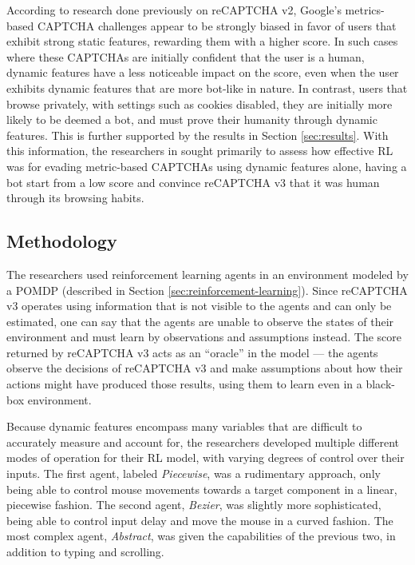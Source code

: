 \documentclass[sigplan,screen,nonacm]{acmart-tagged}
\begin{document}
According to research done previously on reCAPTCHA v2, Google's metrics-based CAPTCHA challenges appear to be strongly biased in favor of users that exhibit strong static features, rewarding them with a higher score. In such cases where these CAPTCHAs are initially confident that the user is a human, dynamic features have a less noticeable impact on the score, even when the user exhibits dynamic features that are more bot-like in nature. In contrast, users that browse privately, with settings such as cookies disabled, they are initially more likely to be deemed a bot, and must prove their humanity through dynamic features. This is further supported by the results in Section \ref{sec:results}. With this information, the researchers in \cite{tsingen} sought primarily to assess how effective RL was for evading metric-based CAPTCHAs using dynamic features alone, having a bot start from a low score and convince reCAPTCHA v3 that it was human through its browsing habits.

\subsection{Methodology}
\label{sec:methodology}

The researchers used reinforcement learning agents in an environment modeled by a POMDP (described in Section \ref{sec:reinforcement-learning}). Since reCAPTCHA v3 operates using information that is not visible to the agents and can only be estimated, one can say that the agents are unable to observe the states of their environment and must learn by observations and assumptions instead. The score returned by reCAPTCHA v3 acts as an ``oracle'' in the model --- the agents observe the decisions of reCAPTCHA v3 and make assumptions about how their actions might have produced those results, using them to learn even in a black-box environment.

Because dynamic features encompass many variables that are difficult to accurately measure and account for, the researchers developed multiple different modes of operation for their RL model, with varying degrees of control over their inputs. The first agent, labeled \textit{Piecewise}, was a rudimentary approach, only being able to control mouse movements towards a target component in a linear, piecewise fashion. The second agent, \textit{Bezier}, was slightly more sophisticated, being able to control input delay and move the mouse in a curved fashion. The most complex agent, \textit{Abstract}, was given the capabilities of the previous two, in addition to typing and scrolling.
\end{document}
